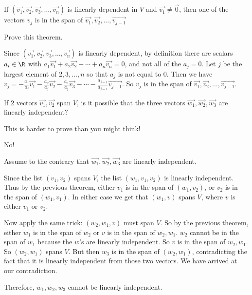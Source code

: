 \documentclass{ximera}
\begin{document}
 \begin{theorem}
 	If $(\vec{v_1},\vec{v_2},\vec{v_3}, \ldots, \vec{v_n})$ is linearly dependent in $V$ and $\vec{v_1} \neq \vec{0}$, then one of the vectors $v_j$ is in the 
 	span of $\vec{v_1},\vec{v_2},\ldots,\vec{v_{j-1}}$
 \end{theorem}
 
Prove this theorem.

\begin{free-response}
 	Since $(\vec{v_1},\vec{v_2},\vec{v_3}, \ldots, \vec{v_n})$ is linearly dependent, by definition there are scalars $a_i \in \R$ with 
 	$a_1\vec{v_1}+a_2\vec{v_2}+ \cdots +a_n\vec{v_n} = 0$, and not all of the $a_j =0$.  Let $j$ be the largest element of ${2,3,\ldots,n}$ so that $a_j$ is not equal to $0$.
 	Then we have 
 	$v_j = -\frac{a_1}{a_j}\vec{v_1}-\frac{a_2}{a_j}\vec{v_2} -\frac{a_3}{a_j}\vec{v_3} - \cdots -\frac{a_{j-1}}{a_{j-1}}\vec{v_{j-1}}$.
 	So $v_j$ is in the span of $\vec{v_1},\vec{v_2},\ldots,\vec{v_{j-1}}$.
 \end{free-response}
 
 
 	If $2$ vectors $\vec{v_1},\vec{v_2}$ span $V$, is it possible that the three vectors $\vec{w_1},\vec{w_2},\vec{w_3}$ are linearly independent?
 	
 	\begin{warning}
 		This is harder to prove than you might think!
 	\end{warning}
\begin{free-response}
	No!
	
	Assume to the contrary that $\vec{w_1},\vec{w_2},\vec{w_3}$ are linearly independent.
	
	Since the list $(v_1,v_2)$ spans $V$, the list $(w_1,v_1,v_2)$ is linearly independent.  Thus by the previous theorem, either $v_1$ is in the span of $(w_1, v_2)$,
	or $v_2$ is in the span of $(w_1,v_1)$.  In either case we get that $(w_1,v)$ spans $V$, where $v$ is either $v_1$ or $v_2$.
	
	Now apply the same trick:  $(w_2,w_1,v)$ must span $V$.  So by the previous theorem, either $w_1$ is in the span of $w_2$ or $v$ is in the span of $w_2,w_1$.  
	$w_2$ cannot be in the span of $w_1$ because the $w$'s are linearly independent.  So $v$ is in the span of $w_2,w_1$.  So $(w_2,w_1)$ spans $V$.  But then
	$w_3$ is in the span of $(w_2,w_1)$, contradicting the fact that it is linearly independent from those two vectors.  We have arrived at our contradiction.
	
	Therefore, $w_1,w_2,w_3$ cannot be linearly independent.
\end{free-response}
\end{document}
